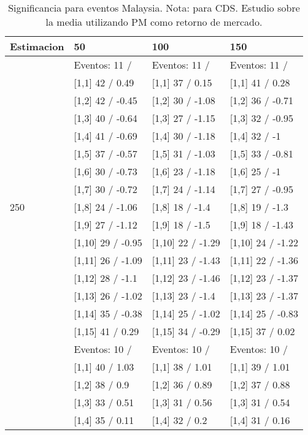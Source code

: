 \begin{table}

\caption{Significancia para eventos Malaysia. Nota: para CDS. Estudio sobre la media utilizando PM como retorno de mercado.}
\centering
\begin{tabular}[t]{llll}
\toprule
Estimacion & 50 & 100 & 150\\
\midrule
 & Eventos:  11 / & Eventos:  11 / & Eventos:  11 /\\
 & {}[1,1] 42  / 0.49 & {}[1,1] 37  / 0.15 & {}[1,1] 41  / 0.28\\
 & {}[1,2] 42  / -0.45 & {}[1,2] 30  / -1.08 & {}[1,2] 36  / -0.71\\
 & {}[1,3] 40  / -0.64 & {}[1,3] 27  / -1.15 & {}[1,3] 32  / -0.95\\
 & {}[1,4] 41  / -0.69 & {}[1,4] 30  / -1.18 & {}[1,4] 32  / -1\\
\addlinespace
 & {}[1,5] 37  / -0.57 & {}[1,5] 31  / -1.03 & {}[1,5] 33  / -0.81\\
 & {}[1,6] 30  / -0.73 & {}[1,6] 23  / -1.18 & {}[1,6] 25  / -1\\
 & {}[1,7] 30  / -0.72 & {}[1,7] 24  / -1.14 & {}[1,7] 27  / -0.95\\
250 & {}[1,8] 24  / -1.06 & {}[1,8] 18  / -1.4 & {}[1,8] 19  / -1.3\\
 & {}[1,9] 27  / -1.12 & {}[1,9] 18  / -1.5 & {}[1,9] 18  / -1.43\\
\addlinespace
 & {}[1,10] 29  / -0.95 & {}[1,10] 22  / -1.29 & {}[1,10] 24  / -1.22\\
 & {}[1,11] 26  / -1.09 & {}[1,11] 23  / -1.43 & {}[1,11] 22  / -1.36\\
 & {}[1,12] 28  / -1.1 & {}[1,12] 23  / -1.46 & {}[1,12] 23  / -1.37\\
 & {}[1,13] 26  / -1.02 & {}[1,13] 23  / -1.4 & {}[1,13] 23  / -1.37\\
 & {}[1,14] 35  / -0.38 & {}[1,14] 25  / -1.02 & {}[1,14] 25  / -0.83\\
\addlinespace
 & {}[1,15] 41  / 0.29 & {}[1,15] 34  / -0.29 & {}[1,15] 37  / 0.02\\
 & Eventos:  10 / & Eventos:  10 / & Eventos:  10 /\\
 & {}[1,1] 40  / 1.03 & {}[1,1] 38  / 1.01 & {}[1,1] 39  / 1.01\\
 & {}[1,2] 38  / 0.9 & {}[1,2] 36  / 0.89 & {}[1,2] 37  / 0.88\\
 & {}[1,3] 33  / 0.51 & {}[1,3] 31  / 0.56 & {}[1,3] 31  / 0.54\\
\addlinespace
 & {}[1,4] 35  / 0.11 & {}[1,4] 32  / 0.2 & {}[1,4] 31  / 0.16\\

\end{tabular}
\end{table}
